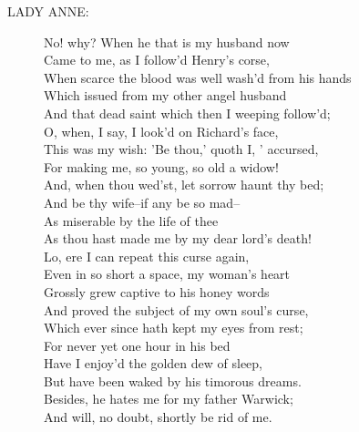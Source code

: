 \documentclass{article}
\begin{document}
\begin{description}
\item[LADY ANNE:] 
\hspace{1pt}No! why?  When he that is my husband now\\
\hspace{1pt}Came to me, as I follow'd Henry's corse,\\
\hspace{1pt}When scarce the blood was well wash'd from his hands\\
\hspace{1pt}Which issued from my other angel husband\\
\hspace{1pt}And that dead saint which then I weeping follow'd;\\
\hspace{1pt}O, when, I say, I look'd on Richard's face,\\
\hspace{1pt}This was my wish: 'Be thou,' quoth I, ' accursed,\\
\hspace{1pt}For making me, so young, so old a widow!\\
\hspace{1pt}And, when thou wed'st, let sorrow haunt thy bed;\\
\hspace{1pt}And be thy wife--if any be so mad--\\
\hspace{1pt}As miserable by the life of thee\\
\hspace{1pt}As thou hast made me by my dear lord's death!\\
\hspace{1pt}Lo, ere I can repeat this curse again,\\
\hspace{1pt}Even in so short a space, my woman's heart\\
\hspace{1pt}Grossly grew captive to his honey words\\
\hspace{1pt}And proved the subject of my own soul's curse,\\
\hspace{1pt}Which ever since hath kept my eyes from rest;\\
\hspace{1pt}For never yet one hour in his bed\\
\hspace{1pt}Have I enjoy'd the golden dew of sleep,\\
\hspace{1pt}But have been waked by his timorous dreams.\\
\hspace{1pt}Besides, he hates me for my father Warwick;\\
\hspace{1pt}And will, no doubt, shortly be rid of me.\\
\end{description}
\end{document}
